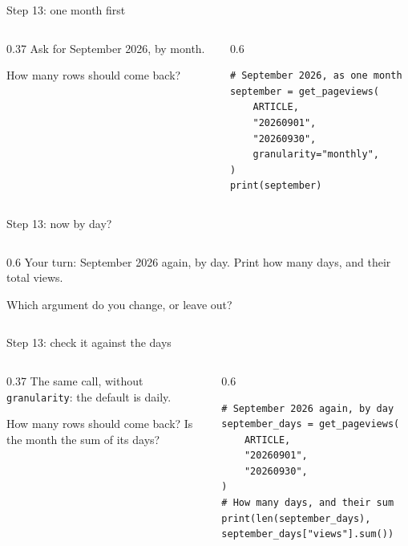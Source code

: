 \documentclass[9pt,aspectratio=169]{beamer}
\begin{document}
\begin{frame}[fragile]{Step 13: one month first}
    \begin{columns}[T]
        \begin{column}{0.37\textwidth}
            Ask for September 2026, by month.

            \medskip
            How many rows should come back?
        \end{column}
        \begin{column}{0.6\textwidth}
\begin{lstlisting}
# September 2026, as one month
september = get_pageviews(
    ARTICLE,
    "20260901",
    "20260930",
    granularity="monthly",
)
print(september)
\end{lstlisting}
        \end{column}
    \end{columns}
\end{frame}

\begin{frame}{Step 13: now by day?}
    \begin{columns}[T]
        \begin{column}{0.6\textwidth}
            Your turn: September 2026 again, by day. Print how many days, and their total views.

            \medskip
            Which argument do you change, or leave out?
        \end{column}
    \end{columns}
\end{frame}

\begin{frame}[fragile]{Step 13: check it against the days}
    \begin{columns}[T]
        \begin{column}{0.37\textwidth}
            The same call, without \texttt{granularity}: the default is daily.

            \medskip
            How many rows should come back? Is the month the sum of its days?
        \end{column}
        \begin{column}{0.6\textwidth}
\begin{lstlisting}
# September 2026 again, by day
september_days = get_pageviews(
    ARTICLE,
    "20260901",
    "20260930",
)
# How many days, and their sum
print(len(september_days), september_days["views"].sum())
\end{lstlisting}
        \end{column}
    \end{columns}
\end{frame}
\end{document}
